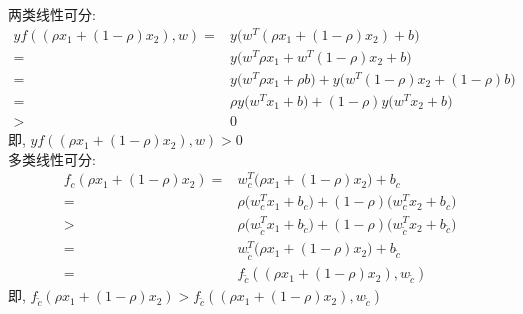 \documentclass[../main.tex]{subfiles}
\begin{document}
两类线性可分:
\begin{align*}
yf((\rho x_1 + (1-\rho) x_2), w)
= & y\big( w^T (\rho x_1 + (1-\rho) x_2) + b \big) \\
= & y \big( w^T \rho x_1 + w^T (1-\rho) x_2 + b \big) \\
= & y \big( w^T \rho x_1 + \rho b \big)
    + y \big( w^T (1-\rho) x_2 + (1-\rho) b \big) \\
= & \rho y \big( w^T x_1 + b \big)
    + (1-\rho) y \big( w^T x_2 + b \big) \\
> & 0
\end{align*}
即,
$yf((\rho x_1 + (1-\rho) x_2), w) > 0$
\\

多类线性可分:
\begin{align*}
f_c(\rho x_1 + (1-\rho) x_2)
= & w_c^T\big( \rho x_1 + (1 - \rho) x_2 \big) + b_c \\
= & \rho \big( w_c^T x_1 + b_c \big)
    + (1-\rho) \big( w_c^T x_2 + b_c \big) \\
> & \rho \big( w^T_{\tilde{c}} x_1 + b_{\tilde{c}} \big)
    + (1-\rho) \big( w^T_{\tilde{c}} x_2 + b_{\tilde{c}} \big) \\
= & w^T_{\tilde{c}}\big( \rho x_1 + (1 - \rho) x_2 \big) + b_{\tilde{c}} \\
= & f_{\tilde{c}}(( \rho x_1 + (1 - \rho) x_2), w_{\tilde{c}})
\end{align*}
即,
$
f_{\tilde{c}}(\rho x_1 + (1-\rho) x_2)
> f_{\tilde{c}}(( \rho x_1 + (1 - \rho) x_2), w_{\tilde{c}})
$
\end{document}

